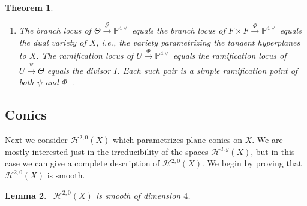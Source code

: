 \documentclass[twoside,12pt,reqno]{amsart}
\theoremstyle{plain}
\newtheorem{thm}{Theorem}[section]
\newtheorem{lem}[thm]{Lemma}
\theoremstyle{definition}
\newcommand{\Hdg}[2]{\mathcal{H}^{#1,#2}}
\newcommand{\PP}{\mathbb{P}}
\def\ps{\vspace{4pt}}
\renewcommand{\xrightarrow}[1]{\mathbin{\stackrel{#1}{\longrightarrow}}}
\begin{document}
\begin{thm}
\begin{enumerate}
\item The branch locus of $\Theta\xrightarrow{\mathcal{G}} \PP^{4\vee}$ equals
the branch locus of $F\times F \xrightarrow{\Phi} \PP^{4\vee}$ equals   
the dual variety of $X$, i.e., the variety 
parametrizing the tangent hyperplanes to $X$.  The 
ramification locus of $U \xrightarrow{\Phi} \PP^{4\vee}$ equals the
ramification 
locus of $U\xrightarrow{\psi} \Theta$ equals
the divisor $I$.  Each
such pair is a simple ramification point of both $\psi$ and
$\Phi$~\cite[lemma 13,8]{CG}.  
\end{enumerate}
\end{thm}

\subsection{Conics}\label{sec-cons}
Next we consider $\Hdg{2}{0}(X)$ which parametrizes plane conics on
$X$.  We are mostly interested just in the irreducibility of the spaces
$\Hdg{d}{g}(X)$, but in this case we can give a complete description
of $\Hdg{2}{0}(X)$.  We begin by proving that $\Hdg{2}{0}(X)$ is
smooth.

\ps

\begin{lem}~\label{lem-cons1}
$\Hdg{2}{0}(X)$ is smooth of dimension $4$.
\end{lem}
\end{document}
